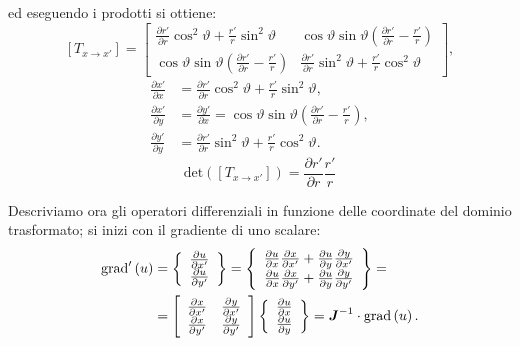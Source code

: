 ed eseguendo i prodotti si ottiene:
\begin{equation}
\label{eq:4composizione3}
\left[T_{x\rightarrow x'}\right]=
\left[\begin{array}{cc}
\frac{\partial r'}{\partial r}\cos^2 \vartheta+\frac{r'}{r}\sin^2\vartheta &
\cos\vartheta \sin\vartheta\left(\frac{\partial r'}{\partial r}-\frac{r'}{r}\right)\\
\cos\vartheta\sin\vartheta\left(\frac{\partial r'}{\partial r}-\frac{r'}{r}\right) & \frac{\partial r'}{\partial r}\sin^2 \vartheta+\frac{r'}{r}\cos^2\vartheta
\end{array}\right],
\end{equation}
\begin{align}
\label{eq:4composizione3_bis}
\frac{\partial x'}{\partial x} &= \frac{\partial r'}{\partial r}\cos^2 \vartheta+\frac{r'}{r}\sin^2\vartheta,\nonumber\\
\frac{\partial x'}{\partial y} &= \frac{\partial y'}{\partial x} =
\cos\vartheta \sin\vartheta\left(\frac{\partial r'}{\partial r}-\frac{r'}{r}\right),\nonumber\\
\frac{\partial y'}{\partial y}&=\frac{\partial r'}{\partial r}\sin^2 \vartheta+\frac{r'}{r}\cos^2\vartheta.\nonumber
\end{align}
\begin{equation}
\label{eq:4det2d}
\text{det}\left(\left[ T_{x\rightarrow x'} \right] \right)=\frac{\partial r'}{\partial r}\frac{r'}{r}
\end{equation}

Descriviamo ora gli operatori differenziali in funzione delle coordinate del dominio trasformato; si inizi con il gradiente di uno scalare:
\begin{align}
\label{eq:4boundarygrad2d}
\text{grad}'\left(u\right) &= \left\{
\begin{array}{c}
\frac{\partial u}{\partial x'}\\
\frac{\partial u}{\partial y'}
\end{array}
\right\} = \left\{
\begin{array}{c}
\frac{\partial u}{\partial x} \frac{\partial x}{\partial x'}+\frac{\partial u}{\partial y} \frac{\partial y}{\partial x'}\\
\frac{\partial u}{\partial x} \frac{\partial x}{\partial y'}+\frac{\partial u}{\partial y} \frac{\partial y}{\partial y'}\end{array}\right\}
 =\nonumber\\
&=  \left[
\begin{array}{cc}
\frac{\partial x}{\partial x'} & \frac{\partial y}{\partial x'}\\
\frac{\partial x}{\partial y'} & \frac{\partial y}{\partial y'}
\end{array}
\right]
\left\{
\begin{array}{c}
\frac{\partial u}{\partial x}\\
\frac{\partial u}{\partial y}
\end{array}
\right\}= \boldsymbol{J}^{-1} \cdot \text{grad}\left(u\right).
\end{align}

